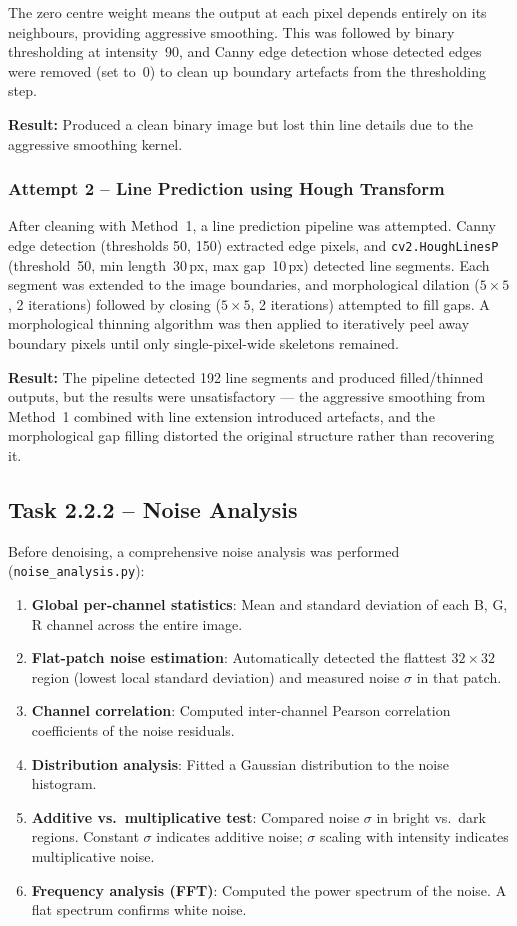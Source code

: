 \documentclass[conference, twocolumn]{IEEEtran}
\begin{document}
The zero centre weight means the output at each pixel depends entirely on its neighbours, providing aggressive smoothing. This was followed by binary thresholding at intensity~90, and Canny edge detection whose detected edges were removed (set to~0) to clean up boundary artefacts from the thresholding step.

\textbf{Result:} Produced a clean binary image but lost thin line details due to the aggressive smoothing kernel.

\subsubsection{Attempt 2 -- Line Prediction using Hough Transform}

After cleaning with Method~1, a line prediction pipeline was attempted. Canny edge detection (thresholds 50, 150) extracted edge pixels, and \texttt{cv2.HoughLinesP} (threshold~50, min length~30\,px, max gap~10\,px) detected line segments. Each segment was extended to the image boundaries, and morphological dilation ($5\times5$, 2 iterations) followed by closing ($5\times5$, 2 iterations) attempted to fill gaps. A morphological thinning algorithm was then applied to iteratively peel away boundary pixels until only single-pixel-wide skeletons remained.

\textbf{Result:} The pipeline detected 192 line segments and produced filled/thinned outputs, but the results were unsatisfactory --- the aggressive smoothing from Method~1 combined with line extension introduced artefacts, and the morphological gap filling distorted the original structure rather than recovering it.

\subsection{Task 2.2.2 -- Noise Analysis}

Before denoising, a comprehensive noise analysis was performed (\texttt{noise\_analysis.py}):

\begin{enumerate}
    \item \textbf{Global per-channel statistics}: Mean and standard deviation of each B, G, R channel across the entire image.
    \item \textbf{Flat-patch noise estimation}: Automatically detected the flattest $32\times32$ region (lowest local standard deviation) and measured noise $\sigma$ in that patch.
    \item \textbf{Channel correlation}: Computed inter-channel Pearson correlation coefficients of the noise residuals.
    \item \textbf{Distribution analysis}: Fitted a Gaussian distribution to the noise histogram.
    \item \textbf{Additive vs.\ multiplicative test}: Compared noise $\sigma$ in bright vs.\ dark regions. Constant $\sigma$ indicates additive noise; $\sigma$ scaling with intensity indicates multiplicative noise.
    \item \textbf{Frequency analysis (FFT)}: Computed the power spectrum of the noise. A flat spectrum confirms white noise.
\end{enumerate}
\end{document}
